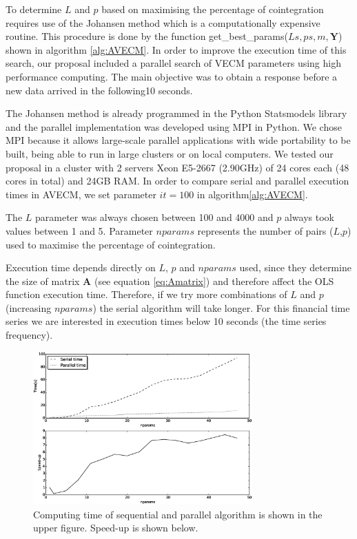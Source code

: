 To determine $L$ and $p$ based on maximising the percentage of cointegration requires use of the 
Johansen
method which is a computationally expensive routine. This procedure is done by the function get\_best\_params($Ls,ps,m,\mathbf{Y}$) shown in algorithm \ref{alg:AVECM}.
In order to improve the execution time of this search, our proposal included
a parallel search of VECM parameters using high performance computing.
The main objective was to obtain a response before a new data arrived in
the following10 seconds.

The Johansen method is already programmed in the Python Statsmodels
library~\cite{seabold2010} and the parallel implementation was developed using
MPI in Python. 
We chose MPI because it allows large-scale parallel applications
with wide portability to be built, being able to run in large clusters
or on local computers.
We tested our proposal in a cluster with 2 servers Xeon E5-2667 (2.90GHz)
of 24 cores each (48 cores in total) and 24GB RAM.
In order to compare serial and parallel execution times in AVECM, we set parameter $it=100$ in algorithm\ref{alg:AVECM}.

The $L$ parameter was always chosen between 100 and 4000 and $p$ always took values
between 1 and 5. Parameter $nparams$ represents the number of pairs ($L$,$p$) used to maximise the percentage of cointegration. 

Execution time depends directly on $L$, $p$ and $nparams$ used, since they determine the size of
matrix $\mathbf{A}$ (see equation \ref{eq:Amatrix}) and therefore affect the OLS function execution time.
Therefore, if we try more combinations of $L$ and $p$ (increasing $nparams$) the
serial algorithm will take longer. For this financial time series we are interested in execution times below 10 seconds  (the time series frequency).

\begin{figure}[ht]
  \centering
  \includegraphics[width=0.75\textwidth]{img/extimes}
  \caption{Computing time of sequential and parallel algorithm is shown in the
  upper figure. Speed-up is shown below.}
  \label{fig:extimes}
\end{figure}

